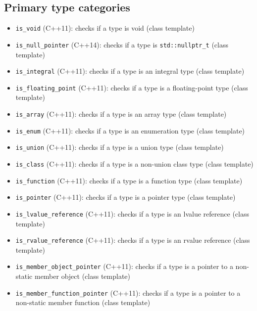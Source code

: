 \documentclass{report}
\begin{document}
    \subsection{Primary type categories}
        \begin{itemize}
            \item \texttt{is\_void} (C++11): checks if a type is void (class template)
            \item \texttt{is\_null\_pointer} (C++14): checks if a type is \texttt{std::nullptr\_t} (class template)
            \item \texttt{is\_integral} (C++11): checks if a type is an integral type (class template)
            \item \texttt{is\_floating\_point} (C++11): checks if a type is a floating-point type (class template)
            \item \texttt{is\_array} (C++11): checks if a type is an array type (class template)
            \item \texttt{is\_enum} (C++11): checks if a type is an enumeration type (class template)
            \item \texttt{is\_union} (C++11): checks if a type is a union type (class template)
            \item \texttt{is\_class} (C++11): checks if a type is a non-union class type (class template)
            \item \texttt{is\_function} (C++11): checks if a type is a function type (class template)
            \item \texttt{is\_pointer} (C++11): checks if a type is a pointer type (class template)
            \item \texttt{is\_lvalue\_reference} (C++11): checks if a type is an lvalue reference (class template)
            \item \texttt{is\_rvalue\_reference} (C++11): checks if a type is an rvalue reference (class template)
            \item \texttt{is\_member\_object\_pointer} (C++11): checks if a type is a pointer to a non-static member object (class template)
            \item \texttt{is\_member\_function\_pointer} (C++11): checks if a type is a pointer to a non-static member function (class template)
        \end{itemize}

        \bigbreak \noindent 
\end{document}
